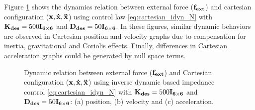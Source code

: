 Figure \ref{fig:act2.3_external_force_vs_cartesian_configuration} shows the dynamics relation between external force ($\mathbf{f_{ext}}$) and cartesian configuration ($\mathbf{x, \dot{x}, \ddot{x}}$) using control law \eqref{eq:cartesian_idyn_N} with $\mathbf{K_{des}}=500\mathbf{I_{6 \times 6}}$ and $\mathbf{D_{des}}=50\mathbf{I_{6 \times 6}}$. In these figures, similar dynamic behaviors are observed in Cartesian position and velocity graphs due to compensation for inertia, gravitational and Coriolis effects. Finally, differences in Cartesian acceleration graphs could be generated by null space terms.

\begin{figure}
\centering
{}
\caption{Dynamic relation between external force ($\mathbf{f_{ext}}$) and Cartesian configuration ($\mathbf{x, \dot{x}, \ddot{x}}$) using inverse dynamic based impedance control \eqref{eq:cartesian_idyn_N} with $\mathbf{K_{des}}=500\mathbf{I_{6 \times 6}}$ and $\mathbf{D_{des}}=50\mathbf{I_{6 \times 6}}$: (a) position, (b) velocity and (c) acceleration.}
\label{fig:act2.3_external_force_vs_cartesian_configuration}
\end{figure}
